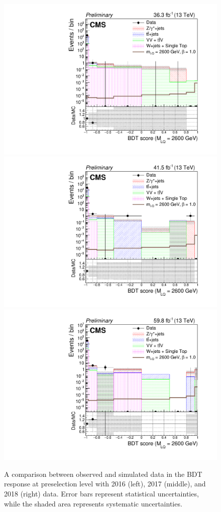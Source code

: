 \begin{figure}[H]
    {\includegraphics[width=.32\textwidth]{Images/Analysis/Results_2016_Unblinded/Plots/Preselection/BasicLQ_uujj_LQToBMu_pair_uubj_BDT_discrim_M2600_standard.pdf}}
    {\includegraphics[width=.32\textwidth]{Images/Analysis/Results_2017_Unblinded/Plots/Preselection/BasicLQ_uujj_LQToBMu_pair_uubj_BDT_discrim_M2600_standard.pdf}}
    {\includegraphics[width=.32\textwidth]{Images/Analysis/Results_2018_Unblinded/Plots/Preselection/BasicLQ_uujj_LQToBMu_pair_uubj_BDT_discrim_M2600_standard.pdf}}
    \caption{A comparison between observed and simulated data in the BDT response at preselection level with 2016 (left), 2017 (middle), and 2018 (right) data. Error bars represent statistical uncertainties, while the shaded area represents systematic uncertainties.}
    \label{figapp:BDT2400to2600}
\end{figure}

